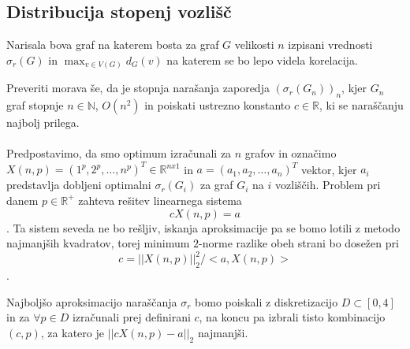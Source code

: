\documentclass[ letterpaper, titlepage, fleqn]{article}
\begin{document}
\subsection{Distribucija stopenj vozlišč}
Narisala bova graf na katerem bosta za graf $G$ velikosti $n$ izpisani
vrednosti $\sigma_r(G)$ in $\max_{v \in V(G)}d_G(v)$ na katerem
se bo lepo videla korelacija.

Preveriti morava še, da je stopnja narašanja zaporedja
$(\sigma_r(G_n))_n$, kjer $G_n$ graf stopnje $n \in \mathbb{N}$,
$O(n^2)$ in poiskati ustrezno konstanto $c \in \mathbb{R}$, ki 
se naraščanju najbolj prilega.
\\\\
Predpostavimo, da smo optimum izračunali za $n$ grafov in
označimo $X(n, p) = (1^p, 2^p, \dots, n^p)^T \in \mathbb{R}^{nx1}$ 
in $a = (a_1, a_2, \dots, a_n)^T$ vektor, kjer $a_i$ predstavlja
dobljeni optimalni $\sigma_r(G_i)$ za graf $G_i$ na $i$ vozliščih.
Problem pri danem $p \in \mathbb{R}^{+}$ zahteva rešitev linearnega sistema 
$$cX(n, p) = a$$.
Ta sistem seveda ne bo rešljiv, iskanja aproksimacije pa se bomo
lotili z metodo najmanjših kvadratov, torej minimum $2$-norme
razlike obeh strani bo dosežen pri
$$c = ||X(n, p)||_{2}^2 / <a, X(n, p)>$$.

Najboljšo aproksimacijo naraščanja $\sigma_r$ bomo poiskali 
z diskretizacijo $D \subset [0, 4]$ in za $\forall p \in D$ 
izračunali prej definirani $c$, na koncu pa izbrali tisto kombinacijo
$(c, p)$, za katero je $||cX(n, p) - a||_{2}$ najmanjši.
\end{document}
